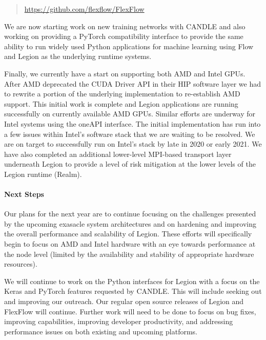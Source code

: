 \begin{quote} 
  \url{https://github.com/flexflow/FlexFlow} 
\end{quote}

We are now starting work on new training networks with CANDLE and also
working on providing a PyTorch compatibility interface to provide the same
ability to run widely used Python applications for machine learning using
Flow and Legion as the underlying runtime systems. 

Finally, we currently have a start on supporting both AMD and Intel
GPUs.  After AMD deprecated the CUDA Driver API in their HIP software
layer we had to rewrite a portion of the underlying implementation to
re-establish AMD support.  This initial work is complete and Legion
applications are running successfully on currently available AMD GPUs.
Similar efforts are underway for Intel systems using the oneAPI
interface.  The initial implementation has run into a few issues
within Intel's software stack that we are waiting to be resolved.  We
are on target to successfully run on Intel's stack by late in 2020 or
early 2021.  We have also completed an additional lower-level
MPI-based transport layer underneath Legion to provide a level of risk
mitigation at the lower levels of the Legion runtime (Realm).

\paragraph{Next Steps}

Our plans for the next year are to continue focusing on the challenges
presented by the upcoming exasacle system architectures and on
hardening and improving the overall performance and scalability of
Legion.  These efforts will specifically begin to focus on AMD and
Intel hardware with an eye towards performance at the node level
(limited by the availability and stability of appropriate hardware
resources).

We will continue to work on the Python interfaces for Legion with a
focus on the Keras and PyTorch features requested by CANDLE.  This
will include seeking out and improving our outreach.  Our regular open
source releases of Legion and FlexFlow will continue.  Further work will
need to be done to focus on bug fixes, improving capabilities, improving
developer productivity, and addressing performance issues on both existing
and upcoming platforms.



